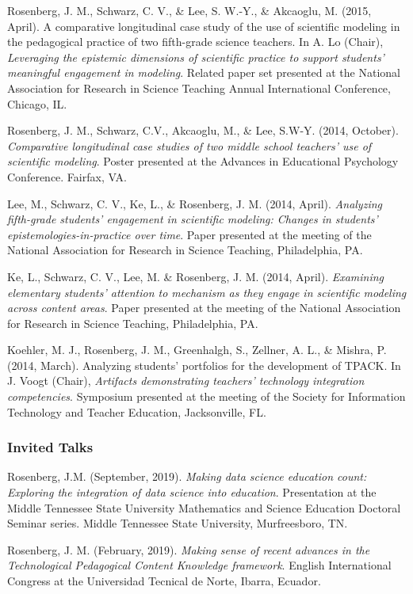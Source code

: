 \documentclass[14,]{article}
\begin{document}
Rosenberg, J. M., Schwarz, C. V., \& Lee, S. W.-Y., \& Akcaoglu, M.
(2015, April). A comparative longitudinal case study of the use of
scientific modeling in the pedagogical practice of two fifth-grade
science teachers. In A. Lo (Chair), \emph{Leveraging the epistemic
dimensions of scientific practice to support students' meaningful
engagement in modeling}. Related paper set presented at the National
Association for Research in Science Teaching Annual International
Conference, Chicago, IL.

Rosenberg, J. M., Schwarz, C.V., Akcaoglu, M., \& Lee, S.W-Y. (2014,
October). \emph{Comparative longitudinal case studies of two middle
school teachers' use of scientific modeling}. Poster presented at the
Advances in Educational Psychology Conference. Fairfax, VA.

Lee, M., Schwarz, C. V., Ke, L., \& Rosenberg, J. M. (2014, April).
\emph{Analyzing fifth-grade students' engagement in scientific modeling:
Changes in students' epistemologies-in-practice over time}. Paper
presented at the meeting of the National Association for Research in
Science Teaching, Philadelphia, PA.

Ke, L., Schwarz, C. V., Lee, M. \& Rosenberg, J. M. (2014, April).
\emph{Examining elementary students' attention to mechanism as they
engage in scientific modeling across content areas}. Paper presented at
the meeting of the National Association for Research in Science
Teaching, Philadelphia, PA.

Koehler, M. J., Rosenberg, J. M., Greenhalgh, S., Zellner, A. L., \&
Mishra, P. (2014, March). Analyzing students' portfolios for the
development of TPACK. In J. Voogt (Chair), \emph{Artifacts demonstrating
teachers' technology integration competencies}. Symposium presented at
the meeting of the Society for Information Technology and Teacher
Education, Jacksonville, FL.

\hypertarget{invited-talks}{%
\subsubsection{Invited Talks}\label{invited-talks}}

Rosenberg, J.M. (September, 2019). \emph{Making data science education
count: Exploring the integration of data science into education}.
Presentation at the Middle Tennessee State University Mathematics and
Science Education Doctoral Seminar series. Middle Tennessee State
University, Murfreesboro, TN.

Rosenberg, J. M. (February, 2019). \emph{Making sense of recent advances
in the Technological Pedagogical Content Knowledge framework}. English
International Congress at the Universidad Tecnical de Norte, Ibarra,
Ecuador.
\end{document}
